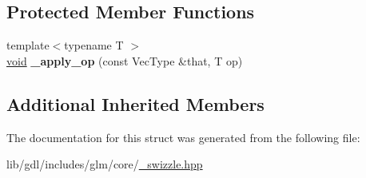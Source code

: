 \subsection*{Protected Member Functions}
\begin{DoxyCompactItemize}
\item 
\hypertarget{structglm_1_1detail_1_1__swizzle__base2_adc355968d70e1f0b34759a8cb78ea6ae}{}{\footnotesize template$<$typename T $>$ }\\\hyperlink{_s_d_l__audio_8h_a52835ae37c4bb905b903cbaf5d04b05f}{void} {\bfseries \+\_\+apply\+\_\+op} (const Vec\+Type \&that, T op)\label{structglm_1_1detail_1_1__swizzle__base2_adc355968d70e1f0b34759a8cb78ea6ae}

\end{DoxyCompactItemize}
\subsection*{Additional Inherited Members}


The documentation for this struct was generated from the following file\+:\begin{DoxyCompactItemize}
\item 
lib/gdl/includes/glm/core/\hyperlink{__swizzle_8hpp}{\+\_\+swizzle.\+hpp}\end{DoxyCompactItemize}

